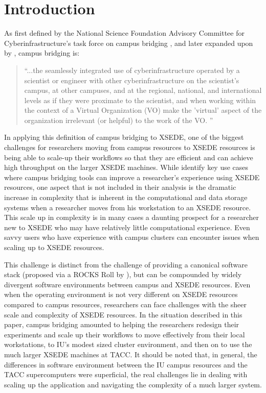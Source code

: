 \documentclass{sig-alternate}
\begin{document}


\section{Introduction}
As first defined by the National Science Foundation Advisory Committee for Cyberinfrastructure's task force on
campus bridging \cite{nsf2011}, and later expanded upon by \citeauthor{stewart2012}, campus bridging is:

\begin{quotation}
``...the seamlessly integrated use of cyberinfrastructure operated by a scientist or engineer
with other cyberinfrastructure on the scientist's campus, at other campuses, and at the regional, national,
and international levels as if they were proximate to the scientist, and when working within the context of a
Virtual Organization (VO) make the 'virtual' aspect of the organization irrelevant (or helpful) to the work of
the VO. \cite{stewart2012}''
\end{quotation}

In applying this definition of campus bridging to XSEDE, one of the biggest challenges for researchers moving
from campus resources to XSEDE resources is being able to scale-up their workflows so that they are efficient
and can achieve high throughput on the larger XSEDE machines. While \citeauthor{stewart2012} identify key use
cases where campus bridging tools can improve a researcher's experience using XSEDE resources, one aspect that
is not included in their analysis is the dramatic increase in complexity that is inherent in the computational
and data storage systems when a researcher moves from his workstation to an XSEDE resource. This scale up in
complexity is in many cases a daunting prospect for a researcher new to XSEDE who may have relatively little
computational experience. Even savvy users who have experience with campus clusters can encounter issues when
scaling up to XSEDE resources.

This challenge is distinct from the challenge of providing a canonical software stack (proposed via a ROCKS
Roll by \citeauthor{stewart2012}), but can be compounded by widely divergent software environments between
campus and XSEDE resources. Even when the operating environment is not very different on XSEDE resources
compared to campus resources, researchers can face challenges with the sheer scale and complexity of XSEDE
resources. In the situation described in this paper, campus bridging amounted to helping the researchers
redesign their experiments and scale up their workflows to move effectively from their local workstations, to IU's modest
sized cluster environment, and then on to use the much larger XSEDE machines at TACC. It should be
noted that, in general, the differences in software environment between the IU campus resources and the TACC
supercomputers were superficial, the real challenges lie in dealing with scaling up the application and
navigating the complexity of a much larger system.
\end{document}

